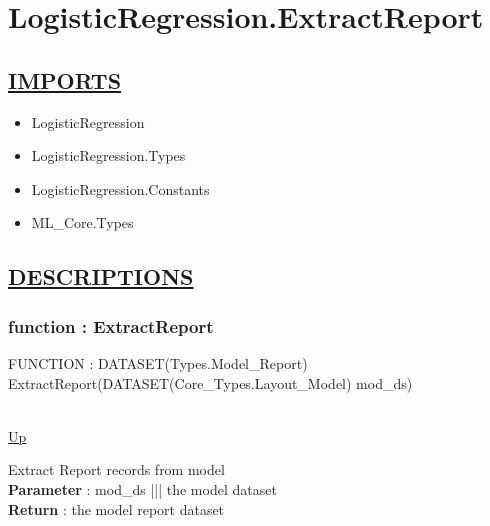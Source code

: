 \chapter*{LogisticRegression.ExtractReport}
\hypertarget{LogisticRegression.ExtractReport}{}

\section*{\underline{IMPORTS}}
\begin{itemize}
\item LogisticRegression
\item LogisticRegression.Types
\item LogisticRegression.Constants
\item ML\_Core.Types
\end{itemize}

\section*{\underline{DESCRIPTIONS}}
\subsection*{function : ExtractReport}
\hypertarget{ecldoc:logisticregression.extractreport}{FUNCTION : DATASET(Types.Model\_Report) ExtractReport(DATASET(Core\_Types.Layout\_Model) mod\_ds)} \\
\hyperlink{ecldoc:}{Up} \\
\par
Extract Report records from model \\
\textbf{Parameter} : mod\_ds ||| the model dataset \\
\textbf{Return} : the model report dataset \\
